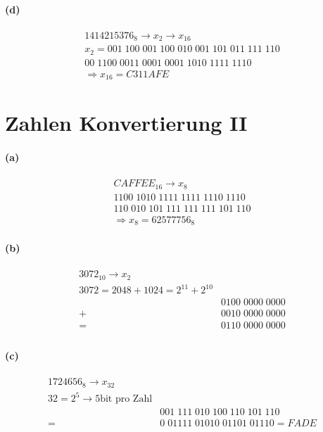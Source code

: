 \documentclass[a4paper]{article}
\begin{document}
\paragraph{(d)}
\begin{align*}
    1414215376_8 \rightarrow x_2 \rightarrow x_{16}\\
    x_2 = 001\;100\;001\;100\;010\;001\;101\;011\;111\;110\\
    00\;1100\;0011\;0001\;0001\;1010\;1111\;1110\;\\
    \Rightarrow x_{16}=C311AFE
\end{align*}


\section{Zahlen Konvertierung II}
\paragraph{(a)}
\begin{align*}
    CAFFEE_{16}\rightarrow x_8\\
    1100\;1010\;1111\;1111\;1110\;1110\\
    110\;010\;101\;111\;111\;111\;101\;110\\
    \Rightarrow x_8 = 62577756_8
\end{align*}

\paragraph{(b)}
\begin{align*}
    3072_{10}\rightarrow x_2\\
    3072=2048+1024=2^{11}+2^{10}\\
    &0100\;0000\;0000\\
    +&0010\;0000\;0000\\
    =&0110\;0000\;0000\\
\end{align*}

\paragraph{(c)}
\begin{align*}
    1724656_8 \rightarrow x_{32}\\
    \text{$32=2^5$}\rightarrow \text{5bit pro Zahl}\\
    &001\;111\;010\;100\;110\;101\;110\\
    =&0\;01111\;01010\;01101\;01110 = FADE\\
\end{align*}
\end{document}
